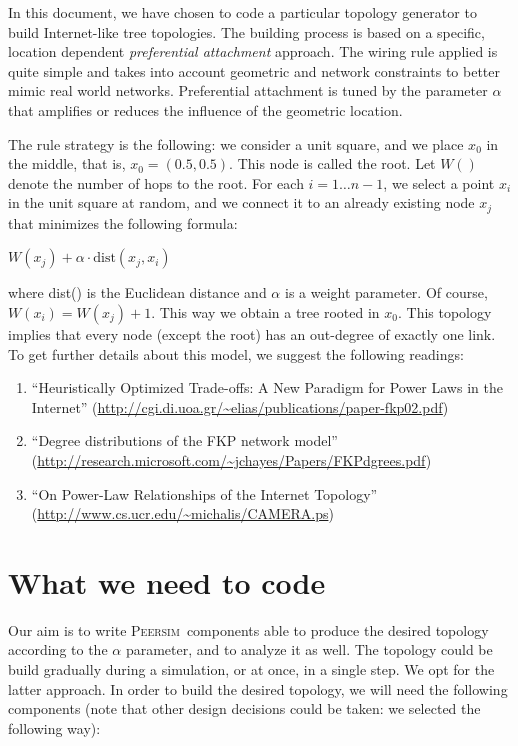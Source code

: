 \documentclass[a4paper,11pt]{article}
\newcommand{\id}[1]{{\scshape\small #1}}
\newcommand{\psim}{\id{Peersim}}
\begin{document}
In this document, we have chosen to code a particular topology generator
to build Internet-like tree topologies. The building process is based
on a specific, location dependent
\emph{preferential attachment} approach. The wiring rule applied is
quite simple and takes into account geometric and network constraints
to better mimic real world networks. Preferential attachment
is tuned by the parameter $\alpha$ that amplifies or reduces the
influence of the geometric location. 

The rule strategy is the following: we consider a unit square,
and we place $x_0$ in the middle, that is, $x_0=(0.5,0.5)$.
This node is called the root. Let $W()$ denote the number of hops to
the root.
For each $i = 1\ldots n-1$, we select a point $x_i$ in the unit square at
random, and we connect it to an already existing node $x_j$
that minimizes the following formula:

\begin{center}
$W(x_j) + \alpha\cdot \mathrm{dist}(x_j,x_i)$
\end{center}

where dist() is the Euclidean distance and $\alpha$ is a weight
parameter.
Of course,  $W(x_i) = W(x_j)+1$.
This way we obtain a tree rooted in $x_0$. This topology implies that
every node (except the root) has an out-degree of exactly one link.
To get further details about this model, we suggest the following
readings:

\begin{enumerate}

\item ``Heuristically Optimized Trade-offs: A New Paradigm for Power
Laws in the Internet''
(\url{http://cgi.di.uoa.gr/~elias/publications/paper-fkp02.pdf})

\item  ``Degree distributions
of the FKP network model''
(\url{http://research.microsoft.com/~jchayes/Papers/FKPdgrees.pdf}) 

\item ``On Power-Law
Relationships of the Internet Topology''
(\url{http://www.cs.ucr.edu/~michalis/CAMERA.ps})

\end{enumerate}

\section{What we need to code}
\label{s:coding}

Our aim is to write \psim\ components able to produce the
desired topology according to the $\alpha$ parameter, and
to analyze it as well.
The topology could be build gradually during a simulation, or
at once, in a single step. We opt for the latter approach.
In order to build the desired topology, we will need the following
components (note that other design decisions could be taken: we selected
the following way):
\end{document}

